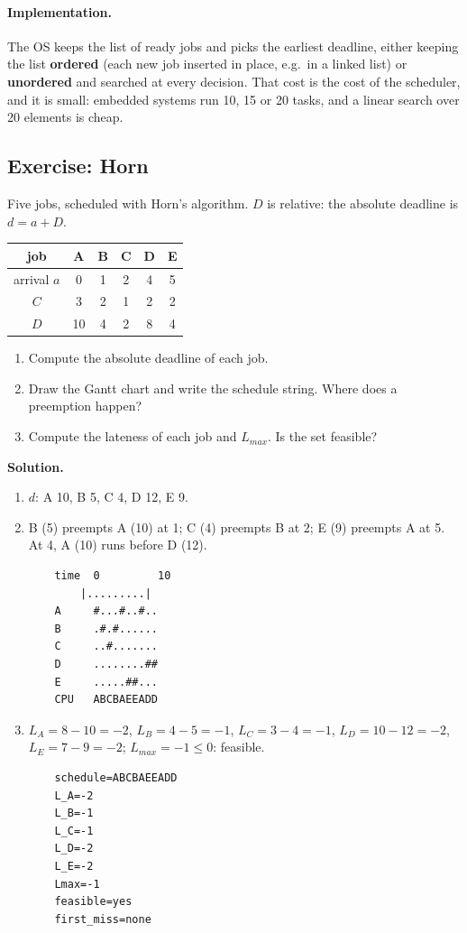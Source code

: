 \paragraph{Implementation.} The OS keeps the list of ready jobs and picks the earliest deadline, either keeping the list \textbf{ordered} (each new job inserted in place, e.g.\ in a linked list) or \textbf{unordered} and searched at every decision. That cost is the cost of the scheduler, and it is small: embedded systems run 10, 15 or 20 tasks, and a linear search over 20 elements is cheap.

\subsection{Exercise: Horn}
Five jobs, scheduled with Horn's algorithm. $D$ is relative: the absolute deadline is $d = a + D$.
\begin{center}
    \begin{tabular}{c | c c c c c}
        \hline
        job & A & B & C & D & E \\
        \hline
        arrival $a$ & 0 & 1 & 2 & 4 & 5 \\
        $C$ & 3 & 2 & 1 & 2 & 2 \\
        $D$ & 10 & 4 & 2 & 8 & 4 \\
        \hline
    \end{tabular}
\end{center}
\begin{enumerate}
    \item Compute the absolute deadline of each job.
    \item Draw the Gantt chart and write the schedule string. Where does a preemption happen?
    \item Compute the lateness of each job and $L_{max}$. Is the set feasible?
\end{enumerate}

\textbf{Solution.}
\begin{enumerate}
    \item $d$: A 10, B 5, C 4, D 12, E 9.
    \item B (5) preempts A (10) at 1; C (4) preempts B at 2; E (9) preempts A at 5. At 4, A (10) runs before D (12).
\begin{verbatim}
    time  0         10
        |.........|
    A     #...#..#..
    B     .#.#......
    C     ..#.......
    D     ........##
    E     .....##...
    CPU   ABCBAEEADD
\end{verbatim}
    \item $L_A = 8 - 10 = -2$, $L_B = 4 - 5 = -1$, $L_C = 3 - 4 = -1$, $L_D = 10 - 12 = -2$, $L_E = 7 - 9 = -2$; $L_{max} = -1 \le 0$: feasible.
\begin{verbatim}
    schedule=ABCBAEEADD
    L_A=-2
    L_B=-1
    L_C=-1
    L_D=-2
    L_E=-2
    Lmax=-1
    feasible=yes
    first_miss=none
\end{verbatim}
\end{enumerate}

